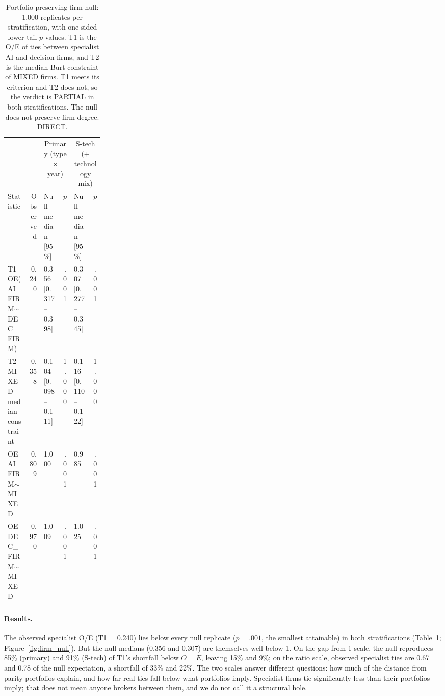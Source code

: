 \begin{table}[tbp]
  \centering
  \small
  \caption{Portfolio-preserving firm null: 1,000 replicates per stratification, with one-sided lower-tail $p$ values. T1 is the O/E of ties between specialist AI and decision firms, and T2 is the median Burt constraint of MIXED firms. T1 meets its criterion and T2 does not, so the verdict is PARTIAL in both stratifications. The null does not preserve firm degree. DIRECT.}
  \label{tab:firm_null}
  \footnotesize
  \setlength{\tabcolsep}{4pt}
  \begin{tabular}{p{0.22\linewidth}rlrlr}
    \toprule
    & & \multicolumn{2}{c}{Primary (type $\times$ year)} & \multicolumn{2}{c}{S-tech (+ technology mix)} \\
    Statistic & Observed & Null median [95\%] & $p$ & Null median [95\%] & $p$ \\
    \midrule
    T1 OE(AI\_FIRM$\sim$\allowbreak DEC\_FIRM) & 0.240 & 0.356 [0.317--0.398] & .001 & 0.307 [0.277--0.345] & .001 \\
    T2 MIXED median constraint & 0.358 & 0.104 [0.098--0.111] & 1.000 & 0.116 [0.110--0.122] & 1.000 \\
    OE AI\_FIRM$\sim$\allowbreak MIXED & 0.809 & 1.000 & .001 & 0.985 & .001 \\
    OE DEC\_FIRM$\sim$\allowbreak MIXED & 0.970 & 1.009 & .001 & 1.025 & .001 \\
    \bottomrule
  \end{tabular}
\end{table}

\paragraph{Results.} The observed specialist O/E (T1 = 0.240) lies below every null replicate ($p = .001$, the smallest attainable) in both stratifications (Table~\ref{tab:firm_null}; Figure~\ref{fig:firm_null}). But the null medians (0.356 and 0.307) are themselves well below 1. On the gap-from-1 scale, the null reproduces 85\% (primary) and 91\% (S-tech) of T1's shortfall below $O = E$, leaving 15\% and 9\%; on the ratio scale, observed specialist ties are 0.67 and 0.78 of the null expectation, a shortfall of 33\% and 22\%. The two scales answer different questions: how much of the distance from parity portfolios explain, and how far real ties fall below what portfolios imply. Specialist firms tie significantly less than their portfolios imply; that does not mean anyone brokers between them, and we do not call it a structural hole.

